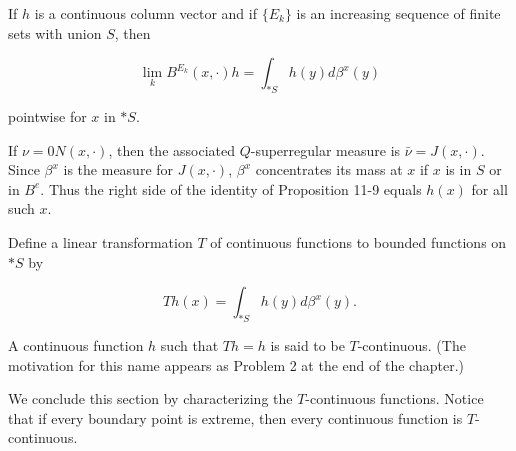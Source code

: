 If $h$ is a continuous column vector and if $\{E_k\}$ is an increasing sequence of finite sets with union $S$, then

$$\lim_k B^{E_k}(x, \cdot)h = \int_{*S} h(y)d\beta^x(y)$$

pointwise for $x$ in $*S$.

If $\nu = 0N(x, \cdot)$, then the associated $Q$-superregular measure is $\bar{\nu} = J(x, \cdot)$. Since $\beta^x$ is the measure for $J(x, \cdot)$, $\beta^x$ concentrates its mass at $x$ if $x$ is in $S$ or in $B^e$. Thus the right side of the identity of Proposition 11-9 equals $h(x)$ for all such $x$.

Define a linear transformation $T$ of continuous functions to bounded functions on $*S$ by

$$Th(x) = \int_{*S} h(y)d\beta^x(y).$$

A continuous function $h$ such that $Th = h$ is said to be $T$-continuous. (The motivation for this name appears as Problem 2 at the end of the chapter.)

We conclude this section by characterizing the $T$-continuous functions. Notice that if every boundary point is extreme, then every continuous function is $T$-continuous.
